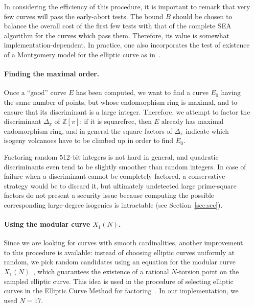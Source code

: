 \documentclass{llncs}
\newcommand{\Z}{\mathbb{Z}}
\begin{document}
In considering the efficiency of this procedure, it is important to remark
that very few curves will pass the early-abort tests. 
The bound $B$ should be chosen 
to balance the overall cost of the first few tests with that of
the complete SEA algorithm for the curves which pass them. Therefore,
its value is somewhat implementation-dependent. In practice, one also
incorporates the test of existence of a Montgomery model for the
elliptic curve as in~\cite{OKS00}.

\paragraph{Finding the maximal order.}
Once a ``good'' curve $E$ has been computed, we want to find a curve
$E_0$ having the same number of points, but whose endomorphism ring is maximal, and
to ensure that its discriminant is a large integer. Therefore, we attempt to
factor the discriminant $Δ_\pi$ of $\Z[\pi]$: if it is squarefree,
then $E$ already has maximal endomorphism ring, and in general the square
factors of $Δ_\pi$ indicate which isogeny volcanoes have to be climbed up
in order to find $E_0$.

\begin{remark}
    Factoring random 512-bit integers is not hard in general, and quadratic discriminants
    even tend to be slightly smoother than random integers.
    In case of failure when a discriminant cannot be completely factored,
		a conservative strategy would be to discard it,
    but ultimately undetected large prime-square factors
    do not present a security issue
    because computing the possible corresponding large-degree isogenies 
    is intractable (see Section~\ref{sec:sec}).
\end{remark}

\paragraph{Using the modular curve $X_1(N)$.}
Since we are looking for curves with smooth cardinalities, another
improvement to this procedure is available: instead of choosing elliptic
curves uniformly at random, we pick random candidates using
an equation for the modular curve $X_1(N)$~\cite{sutherland2012constructing},
which guarantees the existence of a rational $N$-torsion point
on the sampled elliptic curve.
This idea is used
in the procedure of selecting elliptic curves in the Elliptic Curve Method
for factoring~\cite{ECM20,GMP-ECM}.
In our implementation, we used $N = 17$. 
\end{document}
